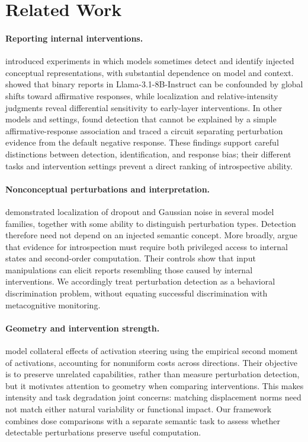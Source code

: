 \section{Related Work}

\paragraph{Reporting internal interventions.}
\citet{lindsey2026} introduced experiments in which models sometimes detect and identify injected conceptual representations, with substantial dependence on model and context.
\citet{hahami2026} showed that binary reports in Llama-3.1-8B-Instruct can be confounded by global shifts toward affirmative responses, while localization and relative-intensity judgments reveal differential sensitivity to early-layer interventions.
In other models and settings, \citet{macar2026} found detection that cannot be explained by a simple affirmative-response association and traced a circuit separating perturbation evidence from the default negative response.
These findings support careful distinctions between detection, identification, and response bias; their different tasks and intervention settings prevent a direct ranking of introspective ability.

\paragraph{Nonconceptual perturbations and interpretation.}
\citet{fornasiere2026} demonstrated localization of dropout and Gaussian noise in several model families, together with some ability to distinguish perturbation types.
Detection therefore need not depend on an injected semantic concept.
More broadly, \citet{singh2026} argue that evidence for introspection must require both privileged access to internal states and second-order computation.
Their controls show that input manipulations can elicit reports resembling those caused by internal interventions.
We accordingly treat perturbation detection as a behavioral discrimination problem, without equating successful discrimination with metacognitive monitoring.

\paragraph{Geometry and intervention strength.}
\citet{nguyen2026} model collateral effects of activation steering using the empirical second moment of activations, accounting for nonuniform costs across directions.
Their objective is to preserve unrelated capabilities, rather than measure perturbation detection, but it motivates attention to geometry when comparing interventions.
This makes intensity and task degradation joint concerns: matching displacement norms need not match either natural variability or functional impact.
Our framework combines dose comparisons with a separate semantic task to assess whether detectable perturbations preserve useful computation.

